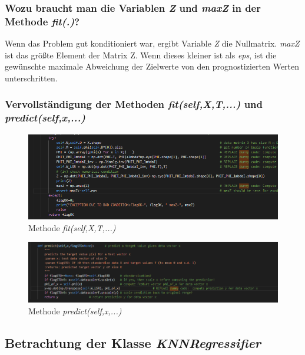 \subsubsection{ Wozu braucht man die Variablen \textit{Z} und \textit{maxZ} in der Methode \textit{fit(.)}? }

\noindent
Wenn das Problem gut konditioniert war, ergibt Variable \textit{Z} die Nullmatrix. \textit{maxZ} ist das größte Element der Matrix Z.
Wenn dieses kleiner ist als \textit{eps}, ist die gewünschte maximale Abweichung der Zielwerte von den prognostizierten Werten unterschritten. 

\subsubsection{ Vervollständigung der Methoden \textit{fit(self,X,T,...)} und \textit{predict(self,x,...)} }

\begin{figure}[H]
    \centering
    \includegraphics[width=1\linewidth]{sections/aufgabe2c_fit.png}
    \caption{Methode \textit{fit(self,X,T,...)}}
\end{figure}

\begin{figure}[H]
    \centering
    \includegraphics[width=1\linewidth]{sections/aufgabe2c_predict.png}
    \caption{Methode \textit{predict(self,x,...)}}
\end{figure}

\subsection{
    Betrachtung der Klasse \textit{KNNRegressifier}
}


